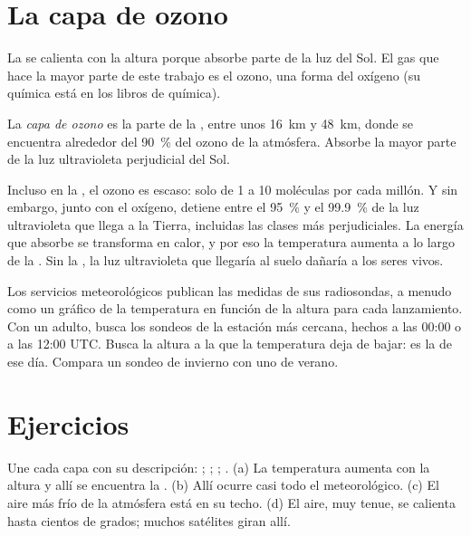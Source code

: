 \section{La capa de ozono}

La  se calienta con la altura porque absorbe parte de la luz
del Sol. El gas que hace la mayor parte de este trabajo es el ozono, una
forma del oxígeno (su química está en los libros de química).

\begin{definition}\label{def:g8:the-atmosphere:ozone-layer}
La \emph{capa de ozono} es la parte de la
, entre unos \qty{16}{km} y \qty{48}{km}, donde se encuentra
alrededor del 90~\% del ozono de la atmósfera. Absorbe la mayor parte de la
luz ultravioleta perjudicial del Sol.
\end{definition}

Incluso en la , el ozono es escaso: solo de 1 a 10 moléculas
por cada millón. Y sin embargo, junto con el oxígeno, detiene entre el
95~\% y el 99.9~\% de la luz ultravioleta que llega a la Tierra, incluidas
las clases más perjudiciales. La energía que absorbe se transforma en
calor, y por eso la temperatura aumenta a lo largo de la . Sin
la , la luz ultravioleta que llegaría al suelo dañaría a los
seres vivos.

\begin{inthefield}
Los servicios meteorológicos publican las medidas de sus radiosondas, a
menudo como un gráfico de la temperatura en función de la altura para cada
lanzamiento. Con un adulto, busca los sondeos de la estación más cercana,
hechos a las 00:00 o a las 12:00 UTC. Busca la altura a la que la
temperatura deja de bajar: es la  de ese día. Compara un sondeo
de invierno con uno de verano.
\end{inthefield}

\section{Ejercicios}

\begin{exercise}[$\star$]\label{exo:g8:the-atmosphere:1}
Une cada capa con su descripción: ; ; ;
. (a) La temperatura aumenta con la altura y allí se encuentra la
. (b) Allí ocurre casi todo el  meteorológico. (c) El
aire más frío de la atmósfera está en su techo. (d) El aire, muy tenue, se
calienta hasta cientos de grados; muchos satélites giran allí.
\end{exercise}

